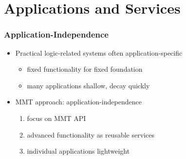 \documentclass{beamer}
\begin{document}
%			
%			

\section{Applications and Services}

\begin{frame}\frametitle{Application-Independence}
\begin{itemize}
  \item Practical logic-related systems often application-\alert{specific}
    \begin{itemize}
      \item fixed functionality for fixed foundation
      \item many applications shallow, decay quickly
    \end{itemize}
 \item MMT approach: application-\alert{independence}
	\begin{enumerate}
	  \item focus on MMT API
	  \item advanced functionality as reusable services
	  \item individual applications lightweight 
	\end{enumerate}
\end{itemize}
\end{frame}
\end{document}
